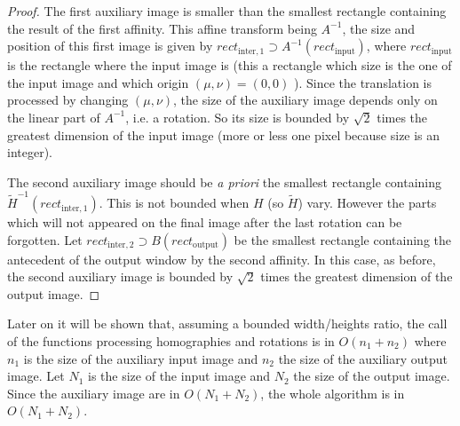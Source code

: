   \begin{proof}
  The first auxiliary image is smaller than the smallest rectangle containing the result of the first affinity. This affine transform being $A^{-1}$, the size and position of this first image is given by $rect_{\text{inter},1} \supset A^{-1}(rect_\text{input})$, where $rect_\text{input}$ is the rectangle where the input image is (this a rectangle which size is the one of the input image and which origin $(\mu,\nu)=(0,0)$ ). Since the translation is processed by changing $(\mu,\nu)$, the size of the auxiliary image depends only on the linear part of $A^{-1}$, i.e. a rotation. So its size is bounded by $\sqrt{2}$ times the greatest dimension of the input image (more or less one pixel because size is an integer).
  
  The second auxiliary image should be \emph{a priori} the smallest rectangle containing $\tilde H^{-1}(rect_{\text{inter},1})$. This is not bounded when $H$ (so $\tilde H$) vary. However the parts which will not appeared on the final image after the last rotation can be forgotten. Let $rect_{\text{inter},2} \supset B(rect_{\text{output}})$ be the smallest rectangle containing the antecedent of the output window by the second affinity. In this case, as before, the second auxiliary image is bounded by $\sqrt{2}$ times the greatest dimension of the output image.
   \end{proof}
 
 Later on it will be shown that, assuming a bounded width/heights ratio, the call of the functions processing homographies and rotations is in $O(n_1+n_2)$ where $n_1$ is the size of the auxiliary input image and $n_2$ the size of the auxiliary output image. Let $N_1$ is the size of the input image and $N_2$ the size of the output image. Since the auxiliary image are in $O(N_1+N_2)$, the whole algorithm is in $O(N_1+N_2)$.
 
 
